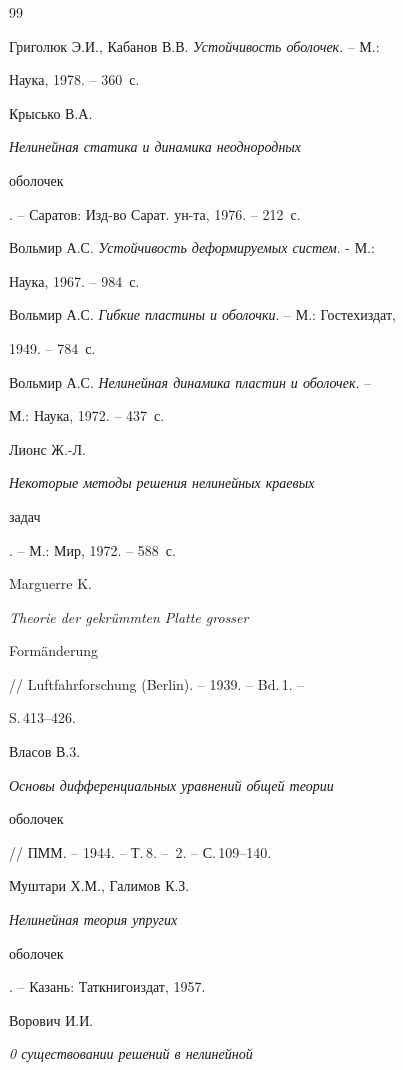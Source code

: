  


\begin{thebibliography}{99} 


 




Григолюк Э.И., Кабанов В.В. {\em Устойчивость оболочек}. -- М.: 


Наука, 1978. -- 360~с. 




Крысько В.А. {\em Нелинейная статика и динамика неоднородных 


оболочек}. -- Саратов: Изд-во Сарат. ун-та, 1976. -- 212~с. 




Вольмир А.С. {\em Устойчивость деформируемых систем}. - М.: 


Наука, 1967. -- 984~с. 




Вольмир А.С. {\em Гибкие пластины и оболочки}. -- М.: Гостехиздат, 


1949. -- 784~с. 




Вольмир А.С. {\em Нелинейная динамика пластин и оболочек}. -- 


М.: Наука, 1972. -- 437~с. 




Лионс Ж.-Л. {\em Некоторые методы решения нелинейных краевых 


задач}. -- М.: Мир, 1972. -- 588~с. 




Marguerre K. {\em Theorie der gekr\"ummten Platte grosser


Form\"anderung} // Luftfahrforschung (Berlin). -- 1939. -- Bd.\,1. -- 


S.\,413--426. 




Власов В.3. {\em Основы дифференциальных уравнений общей теории 


оболочек} // ПММ. -- 1944. -- Т.\,8. -- \No\,2. -- С.\,109--140. 




Муштари Х.М., Галимов К.З. {\em Нелинейная теория упругих 


оболочек}. -- Казань: Таткнигоиздат, 1957. 




Ворович И.И. {\em 0 существовании решений в нелинейной 


}
\end{thebibliography}
